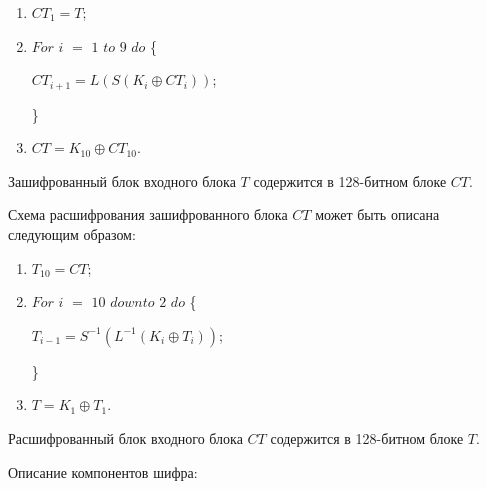 \documentclass{./civarticle}
\begin{document}
\begin{enumerate}
    \item $CT_1 = T$;

    \item $For$ $i$ $=$ $1$ $to$ $9$ $do$ \{ 

    \hspace{0.5cm} $CT_{i+1} = L(S(K_i \oplus CT_{i}))$;
    
    \}

    \item $CT = K_{10} \oplus CT_{10}$.
    
\end{enumerate}

Зашифрованный блок входного блока $T$ содержится в 128-битном блоке $CT$.


Схема расшифрования зашифрованного блока $CT$ может быть описана следующим образом:

\begin{enumerate}
    \item $T_{10} = CT$;

    \item $For$ $i$ $=$ $10$ $downto$ $2$ $do$ \{ 

    \hspace{0.5cm} $T_{i-1} = S^{-1}(L^{-1}(K_i \oplus T_{i}))$;
    
    \}

    \item $T = K_{1} \oplus T_1$.
\end{enumerate}

Расшифрованный блок входного блока $CT$ содержится в 128-битном блоке $T$.

Описание компонентов шифра:
\end{document}
